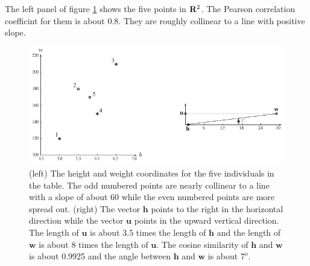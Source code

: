    The left panel of figure \ref{twogeoms} shows the five points in ${\bf R}^2$.
The Pearson correlation coefficint for them is about $0.8$.  They are roughly 
collinear to a line with positive slope.

\begin{figure}[h]
\centering
\includegraphics[scale=1.25]{./images/heightWeight.pdf}
\caption{(left) The height and weight coordinates for the five individuals in
the table.  The odd numbered points are nearly collinear to a line with a
slope of about $60$ while the even numbered points are more spread out.
(right)  The vector $\mathbf{h}$ points to the right in the horizontal 
direction while the vector $\mathbf{u}$ points in the upward vertical 
direction.  The length of $\mathbf{u}$ is about $3.5$ times the length of 
$\mathbf{h}$ and the length of $\mathbf{w}$ is about $8$ times the length of
$\mathbf{u}$.  The cosine similarity of $\mathbf{h}$ and $\mathbf{w}$ is about 
0.9925 and the angle between $\mathbf{h}$ and $\mathbf{w}$ is about $7^o$.} 
\label{twogeoms}
\end{figure}

